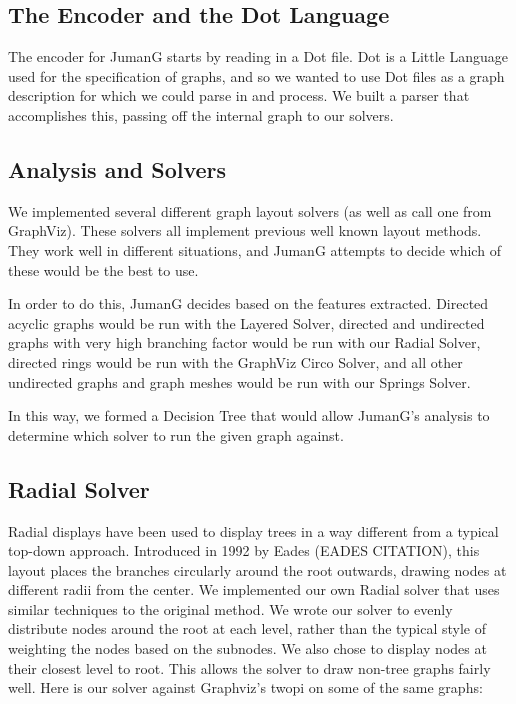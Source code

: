 \documentclass{article}
\begin{document}
\subsection{The Encoder and the Dot Language}
The encoder for JumanG starts by reading in a Dot file. 
Dot is a Little Language used for the specification of graphs, and so we wanted to use Dot files as a graph description for which we could parse in and process.
We built a parser that accomplishes this, passing off the internal graph to our solvers.


\subsection{Analysis and Solvers}
We implemented several different graph layout solvers (as well as call one from GraphViz). These solvers all implement previous well known layout methods. They work well in different situations, and JumanG attempts to decide which of these would be the best to use.

In order to do this, JumanG decides based on the features extracted. Directed acyclic graphs would be run with the Layered Solver, directed and undirected graphs with very high branching factor would be run with our Radial Solver, directed rings would be run with the GraphViz Circo Solver, and all other undirected graphs and graph meshes would be run with our Springs Solver. 

In this way, we formed a Decision Tree that would allow JumanG's analysis to determine which solver to run the given graph against.


\subsection{Radial Solver}
Radial displays have been used to display trees in a way different from a typical top-down approach.
Introduced in 1992 by Eades (EADES CITATION), this layout places the branches circularly around the root outwards, drawing 
nodes at different radii from the center. We implemented our own Radial solver that uses similar techniques to the original
method. We wrote our solver to evenly distribute nodes around the root at each level, rather than the typical style of weighting 
the nodes based on the subnodes. We also chose to display nodes at their closest level to root. 
This allows the solver to draw non-tree graphs fairly well. Here is our solver against Graphviz's twopi on some of the same graphs: 
\end{document}
